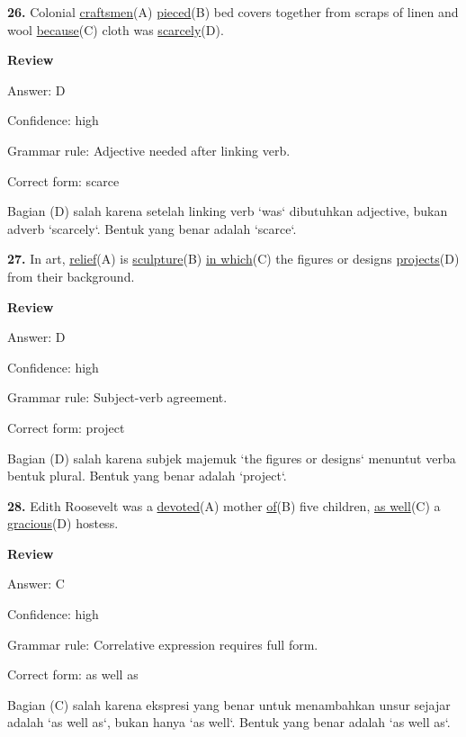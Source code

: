 \documentclass[12pt]{article}
\begin{document}
\endgroup
\par
\vspace{\questionblockgap}
\noindent\textbf{26.} Colonial \uline{craftsmen}(A) \uline{pieced}(B) bed covers together from scraps of linen and wool \uline{because}(C) cloth was \uline{scarcely}(D).
\par
\begingroup
\setlength{\parskip}{0pt}
\setlength{\parindent}{0pt}
\textbf{Review}\par
Answer: D\par
Confidence: high\par
Grammar rule: Adjective needed after linking verb.\par
Correct form: scarce\par
Bagian (D) salah karena setelah linking verb `was` dibutuhkan adjective, bukan adverb `scarcely`. Bentuk yang benar adalah `scarce`.\par
\endgroup
\par
\vspace{\questionblockgap}
\noindent\textbf{27.} In art, \uline{relief}(A) is \uline{sculpture}(B) \uline{in which}(C) the figures or designs \uline{projects}(D) from their background.
\par
\begingroup
\setlength{\parskip}{0pt}
\setlength{\parindent}{0pt}
\textbf{Review}\par
Answer: D\par
Confidence: high\par
Grammar rule: Subject-verb agreement.\par
Correct form: project\par
Bagian (D) salah karena subjek majemuk `the figures or designs` menuntut verba bentuk plural. Bentuk yang benar adalah `project`.\par
\endgroup
\par
\vspace{\questionblockgap}
\noindent\textbf{28.} Edith Roosevelt was a \uline{devoted}(A) mother \uline{of}(B) five children, \uline{as well}(C) a \uline{gracious}(D) hostess.
\par
\begingroup
\setlength{\parskip}{0pt}
\setlength{\parindent}{0pt}
\textbf{Review}\par
Answer: C\par
Confidence: high\par
Grammar rule: Correlative expression requires full form.\par
Correct form: as well as\par
Bagian (C) salah karena ekspresi yang benar untuk menambahkan unsur sejajar adalah `as well as`, bukan hanya `as well`. Bentuk yang benar adalah `as well as`.\par
\end{document}
